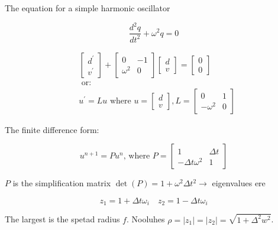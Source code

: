 \documentclass[10pt]{article}
\begin{document}
The equation for a simple harmonic oscillator

\begin{equation}
\frac{d^2 q}{d t^2}+\omega^2 q=0
\end{equation}

\begin{equation}
\begin{aligned}
& {\left[\begin{array}{l}
d^{\prime} \\
v^{\prime}
\end{array}\right]+\left[\begin{array}{ll}
0 & -1 \\
\omega^2 & 0
\end{array}\right]\left[\begin{array}{l}
d \\
v
\end{array}\right]=\left[\begin{array}{l}
0 \\
0
\end{array}\right]} \\
& \text { or: } \\
& u^{\prime}=L u \text { where } u=\left[\begin{array}{l}
d \\
v
\end{array}\right], L=\left[\begin{array}{cc}
0 & 1 \\
-\omega^2 & 0
\end{array}\right]
\end{aligned}
\end{equation}

The finite difference form:

$$
u^{n+1}=P u^n \text {, where } P=\left[\begin{array}{cc}
1 & \Delta t \\
-\Delta t \omega^2 & 1
\end{array}\right]
$$

$P$ is the simplification matrix
$\operatorname{det}(P)=1+\omega^2 \Delta t^2 \rightarrow$ eigenvalues ere

$$
z_1=1+\Delta t \omega_i \quad z_2=1-\Delta t \omega_i
$$

The largest is the spetad radius $f$.
Nooluhes $\rho=\left|z_1\right|=\left|z_2\right|=\sqrt{1+\Delta^2 w^2}$.
\end{document}
